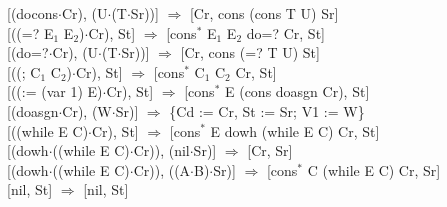 \indent\hspace{0.5cm}[(docons$\cdot$Cr), (U$\cdot$(T$\cdot$Sr))]\hspace{0.7cm} $\Rightarrow$ \hspace{0.5cm} [Cr, cons (cons T U) Sr]\\
\indent\hspace{0.5cm}[((=? E$_1$ E$_2$)$\cdot$Cr), St]\hspace{1.35cm} $\Rightarrow$ \hspace{0.5cm} [cons$^{*}$ E$_1$ E$_2$ do=? Cr, St]\\
\indent\hspace{0.5cm}[(do=?$\cdot$Cr), (U$\cdot$(T$\cdot$Sr))]\hspace{1cm} $\Rightarrow$ \hspace{0.5cm} [Cr, cons (=? T U) St]\\
\indent\hspace{0.5cm}[((; C$_1$ C$_2$)$\cdot$Cr), St]\hspace{1.8cm} $\Rightarrow$ \hspace{0.5cm} [cons$^{*}$ C$_1$ C$_2$ Cr, St]\\
\indent\hspace{0.5cm}[((:= (var 1) E)$\cdot$Cr), St]\hspace{0.9cm} $\Rightarrow$ \hspace{0.5cm} [cons$^{*}$ E (cons doasgn Cr), St]\\
\indent\hspace{0.5cm}[(doasgn$\cdot$Cr), (W$\cdot$Sr)]\hspace{1.35cm} $\Rightarrow$ \hspace{0.5cm} \{Cd := Cr, St := Sr; V1 := W\}\\
\indent\hspace{0.5cm}[((while E C)$\cdot$Cr), St]\hspace{1.35cm} $\Rightarrow$ \hspace{0.5cm} [cons$^{*}$ E dowh (while E C) Cr, St]\\
\indent\hspace{0.5cm}[(dowh$\cdot$((while E C)$\cdot$Cr)), (nil$\cdot$Sr)]\hspace{0.85cm} $\Rightarrow$ \hspace{0.5cm} [Cr, Sr]\\
\indent\hspace{0.5cm}[(dowh$\cdot$((while E C)$\cdot$Cr)), ((A$\cdot$B)$\cdot$Sr)]\hspace{0.3cm} $\Rightarrow$ \hspace{0.5cm} [cons$^{*}$ C (while E C) Cr, Sr]\\
\indent\hspace{0.5cm}[nil, St]\hspace{3.9cm} $\Rightarrow$ \hspace{0.5cm} [nil, St]\\

